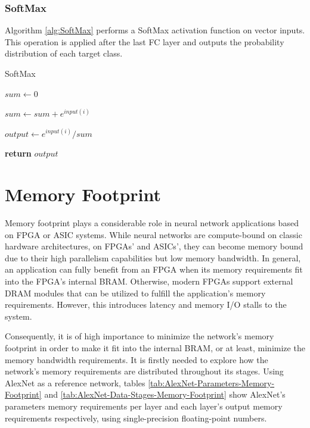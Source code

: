 \subsubsection{SoftMax}
Algorithm \ref{alg:SoftMax} performs a SoftMax activation function on vector inputs. This operation is applied after the last FC layer and outputs the probability distribution of each target class.

\begin{algorithm}[H]
	\caption{SoftMax}\label{alg:SoftMax}
	\begin{algorithmic}[1]
			\State $sum \gets 0$

				\State $sum \gets sum + e^{input(i)}$
			\EndFor

				\State $output \gets e^{input(i)} / sum$
			\EndFor

			\State \textbf{return} $output$
		\EndProcedure
	\end{algorithmic}
\end{algorithm}

\section{Memory Footprint}
Memory footprint plays a considerable role in neural network applications based on FPGA or ASIC systems. While neural networks are compute-bound on classic hardware architectures, on FPGAs' and ASICs', they can become memory bound due to their high parallelism capabilities but low memory bandwidth. In general, an application can fully benefit from an FPGA when its memory requirements fit into the FPGA's internal BRAM. Otherwise, modern FPGAs support external DRAM modules that can be utilized to fulfill the application's memory requirements. However, this introduces latency and memory I/O stalls to the system.

Consequently, it is of high importance to minimize the network's memory footprint in order to make it fit into the internal BRAM, or at least, minimize the memory bandwidth requirements. It is firstly needed to explore how the network's memory requirements are distributed throughout its stages. Using AlexNet as a reference network, tables \ref{tab:AlexNet-Parameters-Memory-Footprint} and \ref{tab:AlexNet-Data-Stages-Memory-Footprint} show AlexNet's parameters memory requirements per layer and each layer's output memory requirements respectively, using single-precision floating-point numbers.

